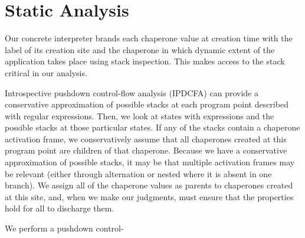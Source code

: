 \documentclass{sigplanconf}
\begin{document}
\section{Static Analysis}

Our concrete interpreter brands each chaperone value at creation time with the label of its creation site and the chaperone in which dynamic extent of the application takes place using stack inspection. This makes access to the stack critical in our analysis.

Introspective pushdown control-flow analysis (IPDCFA) can provide a conservative approximation of possible stacks at each program point described with regular expressions. Then, we look at states with expressions  and the possible stacks at those particular states. If any of the stacks contain a chaperone activation frame, we conservatively assume that all chaperones created at this program point are children of that chaperone. Because we have a conservative approximation of possible stacks, it may be that multiple activation frames may be relevant (either through alternation or nested where it is absent in one branch). We assign all of the chaperone values as parents to chaperones created at this site, and, when we make our judgments, must ensure that the properties hold for all to discharge them.

We perform a pushdown control-





\end{document}
